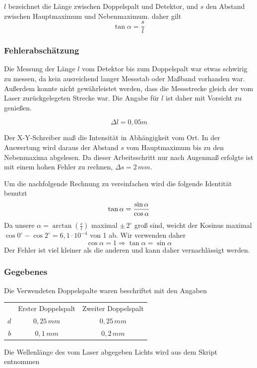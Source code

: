 \documentclass{article}
\begin{document}
\(l\) bezeichnet die Länge zwischen Doppelspalt und Detektor, und \(s\) den Abstand zwischen Hauptmaximum und Nebenmaximum. daher gilt  
\begin{equation}
\tan \alpha = \frac{s}{l}
\label{alpha}
\end{equation}

\subsubsection{Fehlerabschätzung}
Die Messung der Länge \(l\) vom Detektor bis zum Doppelspalt war etwas schwirig zu messen, da kein ausreichend langer Messstab oder Maßband vorhanden war. Außerdem konnte nicht gewährleistet werden, dass die Messstrecke gleich der vom Laser zurückgelegeten Strecke war. Die Angabe für \(l\) ist daher mit Vorsicht zu genießen.

\begin{equation}
\Delta l =  0,05 m
\end{equation}
\noindent

Der X-Y-Schreiber maß die Intensität in Abhängigkeit vom Ort. In der Auswertung wird daraus der Abstand \(s\) vom Hauptmaximum bis zu den Nebenmaxima abgelesen. Da dieser Arbeitsschritt nur nach Augenmaß erfolgte ist mit einem hohen Fehler zu rechnen, \(\Delta s = 2\,mm \). 

Um die nachfolgende Rechnung zu vereinfachen wird die folgende Identität benutzt
\begin{equation}
\tan \alpha = \frac{\sin \alpha}{\cos \alpha}
\notag
\end{equation}
Da unsere \( \alpha = \arctan \left( \frac{s}{l} \right) \) maximal \(  \pm \, 2^\circ \) groß sind, weicht der Kosinus maximal \( \cos 0^\circ - \cos 2^\circ = 6,1 \cdot 10^{-4} \) von 1 ab. Wir verwenden daher
\begin{equation}
\cos \alpha = 1 \Rightarrow \tan \alpha = \sin \alpha
\label{sin=tan}
\end{equation}
Der Fehler ist viel kleiner als die anderen und kann daher vernachlässigt werden.

\subsubsection{Gegebenes}
Die Verwendeten Doppelspalte waren beschriftet mit den Angaben
\begin{center}
\begin{tabular}{r c c}
		& Erster Doppelspalt & Zweiter Doppelspalt \\
	\(d\)	& \( 0,25\, mm\) & \( 0,25\, mm \)  \\
	\(b\)	& \( 0,1\, mm\)	& \( 0,2\, mm \)  
\end{tabular}
\end{center}
Die Wellenlänge des vom Laser abgegeben Lichts wird aus dem Skript entnommen
\end{document}
